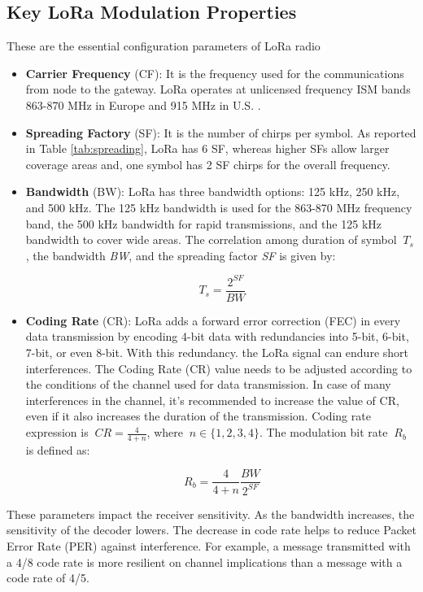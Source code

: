 \subsection{Key LoRa Modulation Properties}
These are the essential configuration parameters of LoRa radio
\begin{itemize}
    \item \textbf{Carrier Frequency} (CF): It is the frequency used for the communications from node to the gateway. LoRa operates at unlicensed frequency ISM bands 863-870 MHz in Europe and 915 MHz in U.S. \cite{7925650}.
    \item \textbf{Spreading Factory} (SF): It is the number of chirps per symbol. As reported in Table \ref{tab:spreading}, LoRa has 6 SF, whereas higher SFs allow larger coverage areas and, one symbol has 2 SF chirps for the overall frequency.

     

    \item \textbf{Bandwidth} (BW): LoRa has three bandwidth options: 125 kHz, 250 kHz, and 500 kHz. The 125 kHz bandwidth is used for the 863-870 MHz frequency band, the 500 kHz bandwidth for rapid transmissions, and the 125 kHz bandwidth to cover wide areas. The correlation among duration of symbol \(\ T_{s} \), the bandwidth \textit{BW}, and the spreading factor \textit{SF} is given by:
    
    \[\ T_{s} = \frac{2^{SF}}{BW} \]
    
    \vspace{0.5pt}
    
    \item \textbf{Coding Rate} (CR): LoRa adds a forward error correction (FEC) in every data transmission by encoding 4-bit data with redundancies into 5-bit, 6-bit, 7-bit, or even 8-bit. With this redundancy. the LoRa signal can endure short interferences. The Coding Rate (CR) value needs to be adjusted according to the conditions of the channel used for data transmission. In case of many interferences in the channel, it’s recommended to increase the value of CR, even if it also increases the duration of the transmission. Coding rate expression is \(\ CR = \frac{4}{4+n} \), where \(\ n \in \{1,2,3,4\} \). The modulation bit rate \(\ R_{b} \) is defined as:
    
    \[\ R_{b} = \frac{4}{4 + n}\frac{BW}{2^{SF}} \]
    
    \vspace{1pt}

\end{itemize}
These parameters impact the receiver sensitivity. As the bandwidth increases, the sensitivity of the decoder lowers. The decrease in code rate helps to reduce Packet Error Rate (PER) against interference. For example, a message transmitted with a 4/8 code rate is more resilient on channel implications than a message with a code rate of 4/5.

